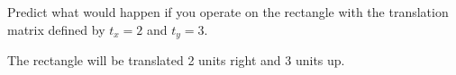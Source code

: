 Predict what would happen if you operate on the rectangle with the translation matrix defined by $t_x = 2$ and $t_y = 3$.

\begin{solution}
    The rectangle will be translated 2 units right and 3 units up.
\end{solution}